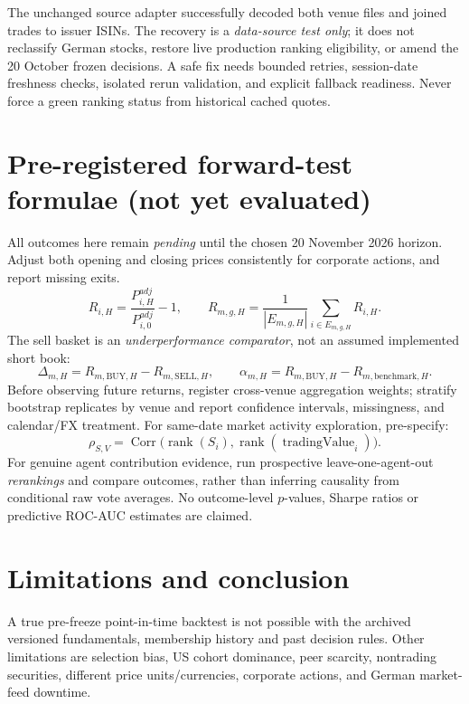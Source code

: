 \documentclass[11pt,a4paper]{article}
\begin{document}
The unchanged source adapter successfully decoded both venue files and joined trades to issuer ISINs. The recovery is a \emph{data-source test only}; it does not reclassify German stocks, restore live production ranking eligibility, or amend the 20 October frozen decisions. A safe fix needs bounded retries, session-date freshness checks, isolated rerun validation, and explicit fallback readiness. Never force a green ranking status from historical cached quotes.

\section{Pre-registered forward-test formulae (not yet evaluated)}
All outcomes here remain \emph{pending} until the chosen 20 November 2026 horizon. Adjust both opening and closing prices consistently for corporate actions, and report missing exits.
\begin{equation}
R_{i,H}=\frac{P_{i,H}^{adj}}{P_{i,0}^{adj}}-1,\qquad
R_{m,g,H}=\frac{1}{|E_{m,g,H}|}\sum_{i\in E_{m,g,H}}R_{i,H}.
\label{eq:returns}
\end{equation}
The sell basket is an \emph{underperformance comparator}, not an assumed implemented short book:
\begin{equation}
\Delta_{m,H}=R_{m,\mathrm{BUY},H}-R_{m,\mathrm{SELL},H},\qquad
\alpha_{m,H}=R_{m,\mathrm{BUY},H}-R_{m,\mathrm{benchmark},H}.
\label{eq:spread}
\end{equation}
Before observing future returns, register cross-venue aggregation weights; stratify bootstrap replicates by venue and report confidence intervals, missingness, and calendar/FX treatment. For same-date market activity exploration, pre-specify:
\begin{equation}
\rho_{S,V}=
\operatorname{Corr}\!\bigl(\operatorname{rank}(S_i),
                           \operatorname{rank}(\operatorname{tradingValue}_i)\bigr).
\label{eq:spearman}
\end{equation}
For genuine agent contribution evidence, run prospective leave-one-agent-out \emph{rerankings} and compare outcomes, rather than inferring causality from conditional raw vote averages. No outcome-level $p$-values, Sharpe ratios or predictive ROC-AUC estimates are claimed.

\section{Limitations and conclusion}
A true pre-freeze point-in-time backtest is not possible with the archived versioned fundamentals, membership history and past decision rules. Other limitations are selection bias, US cohort dominance, peer scarcity, nontrading securities, different price units/currencies, corporate actions, and German market-feed downtime.
\end{document}
